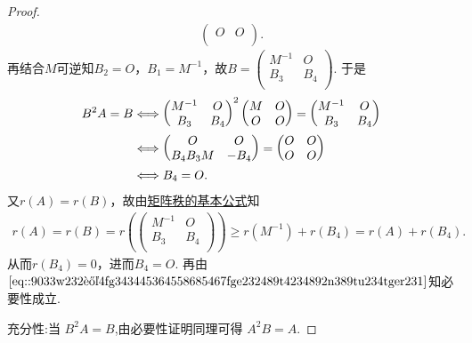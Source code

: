 \documentclass[../../main.tex]{subfiles}%
\begin{document}
\begin{proof}
\begin{align*}
\begin{pmatrix}
O&		O\\
\end{pmatrix}.
\end{align*}
再结合\(M\)可逆知\(B_2 = O\)，\(B_1 = M^{-1}\)，故\(B = \begin{pmatrix}
M^{-1}&		O\\
B_3&		B_4\\
\end{pmatrix}\). 于是
\begin{align}
B^2A = B &\Longleftrightarrow \begin{pmatrix}
M^{-1}&		O\\
B_3&		B_4\\
\end{pmatrix}^2 \begin{pmatrix}
M&		O\\
O&		O\\
\end{pmatrix} = \begin{pmatrix}
M^{-1}&		O\\
B_3&		B_4\\
\end{pmatrix} \notag \\
&\Longleftrightarrow \begin{pmatrix}
O&		O\\
B_4B_3M&		-B_4\\
\end{pmatrix} = \begin{pmatrix}
O&		O\\
O&		O\\
\end{pmatrix} \notag \\
&\Longleftrightarrow B_4 = O. \label{eq::9033w232让4fg343445364558685467fge232489t4234892n389tu234tger231}
\end{align}
又\(r(A) = r(B)\)，故由\hyperref[proposition:矩阵秩的基本公式]{矩阵秩的基本公式}知
\begin{align*}
r(A) = r(B) = r\left( \begin{pmatrix}
M^{-1}&		O\\
B_3&		B_4\\
\end{pmatrix} \right) \geqslant r(M^{-1}) + r(B_4) = r(A) + r(B_4).
\end{align*}
从而\(r(B_4) = 0\)，进而\(B_4 = O\). 再由\(\eqref{eq::9033w232让4fg343445364558685467fge232489t4234892n389tu234tger231}\)知必要性成立.

{\heiti 充分性:}当 \(B^2A = B\),由必要性证明同理可得 \(A^2B = A\).


\end{proof}
\end{document}
